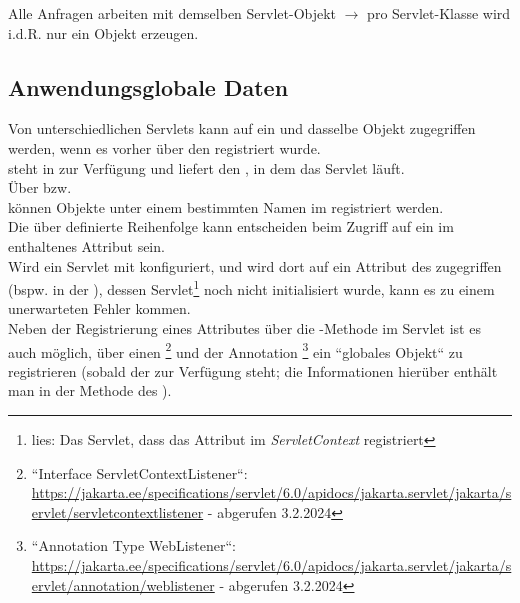 \begin{tcolorbox}[enlarge top by=0.5cm,enlarge bottom by=0.5cm]
Alle Anfragen arbeiten mit demselben Servlet-Objekt $\rightarrow$ pro Servlet-Klasse wird i.d.R. nur ein Objekt erzeugen.
\end{tcolorbox}


\subsection{Anwendungsglobale Daten}

Von unterschiedlichen Servlets kann auf ein und dasselbe Objekt zugegriffen werden, wenn es vorher über den  registriert wurde.\\
 steht in  zur Verfügung und liefert den , in dem das Servlet läuft.\\
Über  bzw.\\  können Objekte unter einem bestimmten Namen im  registriert werden.\\

\noindent
Die über  definierte Reihenfolge kann entscheiden beim Zugriff auf ein im  enthaltenes Attribut sein.\\
Wird ein Servlet mit  konfiguriert, und wird dort auf ein Attribut des  zugegriffen (bspw. in der ), dessen Servlet\footnote{
lies: Das Servlet, dass das Attribut im \textit{ServletContext} registriert
} noch nicht initialisiert wurde, kann es zu einem unerwarteten Fehler kommen.\\

\noindent
Neben der Registrierung eines Attributes über die -Methode im Servlet ist es auch möglich, über einen \footnote{
    ``Interface ServletContextListener``: \url{https://jakarta.ee/specifications/servlet/6.0/apidocs/jakarta.servlet/jakarta/servlet/servletcontextlistener} - abgerufen 3.2.2024
} und der Annotation \footnote{
``Annotation Type WebListener``: \url{https://jakarta.ee/specifications/servlet/6.0/apidocs/jakarta.servlet/jakarta/servlet/annotation/weblistener} - abgerufen 3.2.2024
} ein ``globales Objekt`` zu registrieren (sobald der  zur Verfügung steht; die Informationen hierüber enthält man in der Methode  des ).\\

